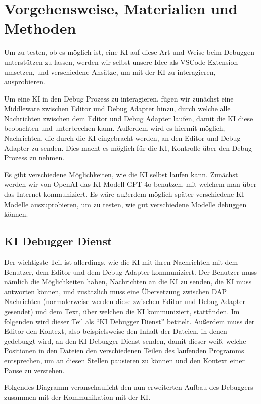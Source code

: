 \documentclass[a4paper,12pt,ngerman]{scrartcl}
\begin{document}
\section{Vorgehensweise, Materialien und Methoden}

Um zu testen, ob es möglich ist, eine KI auf diese Art und Weise beim Debuggen unterstützen zu lassen, werden wir selbst unsere Idee als VSCode Extension umsetzen, und verschiedene Ansätze, um mit der KI zu interagieren, ausprobieren.

Um eine KI in den Debug Prozess zu interagieren, fügen wir zunächst eine Middleware zwischen Editor und Debug Adapter hinzu, durch welche alle Nachrichten zwischen dem Editor und Debug Adapter laufen, damit die KI diese beobachten und unterbrechen kann. Außerdem wird es hiermit möglich, Nachrichten, die durch die KI eingebracht werden, an den Editor und Debug Adapter zu senden. Dies macht es möglich für die KI, Kontrolle über den Debug Prozess zu nehmen.

Es gibt verschiedene Möglichkeiten, wie die KI selbst laufen kann. Zunächst werden wir von OpenAI das KI Modell GPT-4o benutzen, mit welchem man über das Internet kommuniziert. Es wäre außerdem möglich später verschiedene KI Modelle auszuprobieren, um zu testen, wie gut verschiedene Modelle debuggen können.

\subsection{KI Debugger Dienst}

Der wichtigste Teil ist allerdings, wie die KI mit ihren Nachrichten mit dem Benutzer, dem Editor und dem Debug Adapter kommuniziert. Der Benutzer muss nämlich die Möglichkeiten haben, Nachrichten an die KI zu senden, die KI muss antworten können, und zusätzlich muss eine Übersetzung zwischen DAP Nachrichten (normalerweise werden diese zwischen Editor und Debug Adapter gesendet) und dem Text, über welchen die KI kommuniziert, stattfinden. Im folgenden wird dieser Teil als ``KI Debugger Dienst'' betitelt. Außerdem muss der Editor den Kontext, also beispielsweise den Inhalt der Dateien, in denen gedebuggt wird, an den KI Debugger Dienst senden, damit dieser weiß, welche Positionen in den Dateien den verschiedenen Teilen des laufenden Programms entsprechen, um an diesen Stellen pausieren zu können und den Kontext einer Pause zu verstehen.

Folgendes Diagramm veranschaulicht den nun erweiterten Aufbau des Debuggers zusammen mit der Kommunikation mit der KI.
\end{document}
